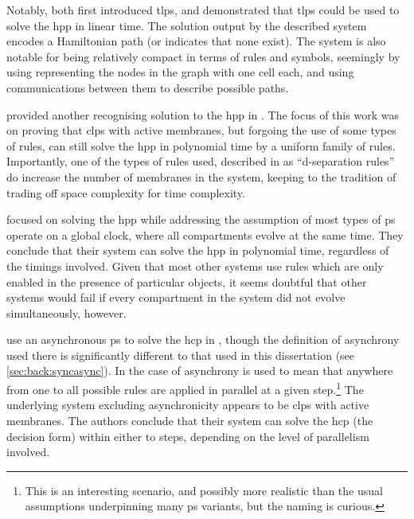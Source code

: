 
Notably, \cite{Martin-Vide2003} both first introduced \gls{tlps}, and demonstrated that \gls{tlps} could be used to solve the \gls{hpp} in linear time.  The solution output by the described system encodes a Hamiltonian path (or indicates that none exist).  The system is also notable for being relatively compact in terms of rules and symbols, seemingly by using representing the nodes in the graph with one cell each, and using communications between them to describe possible paths.


\citeauthor{Pan2006} provided another recognising solution to the \gls{hpp} in \cite{Pan2006}.  The focus of this work was on proving that \gls{clps} with active membranes, but forgoing the use of some types of rules, can still solve the \gls{hpp} in polynomial time by a uniform family of rules.  Importantly, one of the types of rules used, described in \cite{Pan2006} as ``d-separation rules'' do increase the number of membranes in the system, keeping to the tradition of trading off space complexity for time complexity.


\citeauthor{Song2013} focused on solving the \gls{hpp} while addressing the assumption of most types of \gls{ps} operate on a global clock, where all \glspl{compartment} evolve at the same time.  They conclude that their system can solve the \gls{hpp} in polynomial time, regardless of the timings involved.  Given that most other systems use rules which are only enabled in the presence of particular objects, it seems doubtful that other systems would fail if every \gls{compartment} in the system did not evolve simultaneously, however.


\citeauthor{Tagawa2012} use an asynchronous \gls{ps} to solve the \gls{hcp} in \cite{Tagawa2012}, though the definition of asynchrony used there is significantly different to that used in this dissertation (see \vref{sec:back:syncasync}).  In the case of \cite{Tagawa2012} asynchrony is used to mean that anywhere from one to all possible rules are applied in parallel at a given step.\footnote{This is an interesting scenario, and possibly more realistic than the usual assumptions underpinning many \gls{ps} variants, but the naming is curious.}  The underlying system excluding asynchronicity appears to be \gls{clps} with active membranes.  The authors conclude that their system can solve the \gls{hcp} (the decision form) within either  to  steps, depending on the level of parallelism involved.

